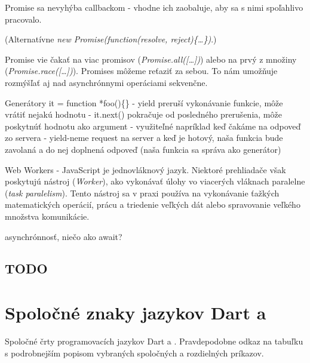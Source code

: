 Promise sa nevyhýba callbackom - vhodne ich zaobaluje, aby sa s nimi spoľahlivo pracovalo.

(Alternatívne \emph{new Promise(function(resolve, reject)\{\ldots\})}.)

Promise vie čakať na viac promisov (\emph{Promise.all([\ldots])})
alebo na prvý z množiny (\emph{Promise.race([\ldots])}).
Promises môžeme reťaziť za sebou. To nám umožňuje rozmýšľať aj nad asynchrónnymi operáciami sekvenčne.%


Generátory
it = function *foo()\{\}
  - yield preruší vykonávanie funkcie, môže vrátiť nejakú hodnotu
  - it.next() pokračuje od posledného prerušenia, môže poskytnúť hodnotu ako argument
  - využiteľné napríklad keď čakáme na odpoveď zo servera - yield-neme request na server a keď je hotový, naša funkcia bude zavolaná a do nej doplnená odpoveď (naša funkcia sa správa ako generátor)


Web Workers - JavaScript je jednovláknový jazyk. Niektoré prehliadače však poskytujú nástroj (\emph{Worker}), ako vykonávať úlohy vo viacerých vláknach paralelne (\emph{task paralelism}). Tento nástroj sa v praxi používa na vykonávanie ťažkých matematických operácií, prácu a triedenie veľkých dát alebo spravovanie veľkého množstva komunikácie.


\TODO asynchrónnosť, niečo ako await?

\subsection{TODO}
\cite[introduction]{flanagan2006javascript} \cite[\JS{}]{ECMAScript}

\section{Spoločné znaky jazykov Dart a \JS{}}
Spoločné črty programovacích jazykov Dart a \JS{}. Pravdepodobne odkaz na tabuľku s podrobnejším popisom vybraných spoločných a rozdielných príkazov.

